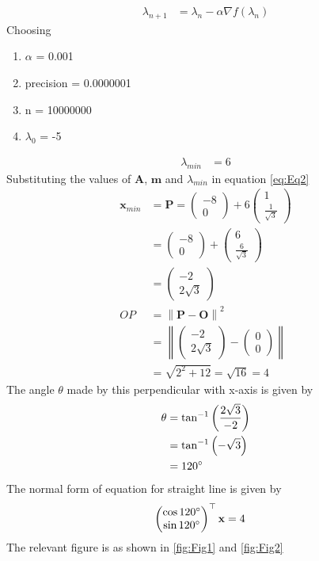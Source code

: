 \documentclass[12pt]{article}
\providecommand{\brak}[1]{\ensuremath{\left(#1\right)}}
\providecommand{\norm}[1]{\left\lVert#1\right\rVert}
\newcommand{\myvec}[1]{\ensuremath{\begin{pmatrix}#1\end{pmatrix}}}
\let\vec\mathbf
\begin{document}
\begin{enumerate}
\begin{align}
	\label{eq:grad_des}
	\lambda_{n+1} &= \lambda_n - \alpha \nabla f\brak{\lambda_n}
\end{align}
Choosing
\begin{enumerate}
 \item $\alpha$ = 0.001
 \item precision = 0.0000001
 \item n = 10000000 
 \item $\lambda_0$ = -5 
\end{enumerate}
\begin{align}
	\lambda_{min} &= 6 
\end{align}
Substituting the values of $\vec{A}$, $\vec{m}$ and $\lambda_{min}$ in equation \eqref{eq:Eq2} 
\begin{align}
	\vec{x}_{min} &= \vec{P} = \myvec{-8 \\ 0}+6\myvec{1 \\ \frac{1}{\sqrt{3}}}  \\
	&= \myvec{-8 \\ 0}+\myvec{6 \\ \frac{6}{\sqrt{3}}} \\
	&= \myvec{-2 \\ 2\sqrt{3}} \\
	OP &= \norm{\vec{P}-\vec{O}}^2 \\ 
	&= \norm{\myvec{-2 \\ 2\sqrt{3}}-\myvec{0 \\ 0}} \\
	&= \sqrt{2^2 + 12} = \sqrt{16} = 4
\end{align}
The angle $\theta$ made by this perpendicular with x-axis is given by
\begin{align}
         \theta &= \tan^{-1}\brak{\frac{2\sqrt{3}}{-2}} \\
	 &= \tan^{-1}\brak{-\sqrt{3}} \\
	 &= 120\degree
\end{align}
The normal form of equation for straight line is given by
\begin{align}
	\myvec{\cos120\degree \\ \sin120\degree}^\top\vec{x} &= 4 
\end{align}
The relevant figure is as shown in \ref{fig:Fig1} and \ref{fig:Fig2}
\begin{figure}[!h]
	\begin{center}

\end{center}
\end{figure}
\end{enumerate}
\end{document}
